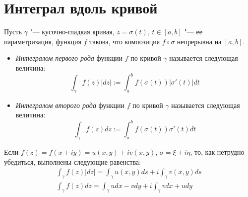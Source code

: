 \section{Интеграл вдоль кривой}

\begin{definition}
	Пусть $\gamma$ "--- кусочно-гладкая кривая, $z = \sigma(t)$, $t \in [a, b]$ "--- ее параметризация, функция $f$ такова, что композиция $f\circ\sigma$ непрерывна на $[a, b]$.
	\begin{itemize}
		\item \textit{Интегралом первого рода} функции $f$ по кривой $\gamma$ называется следующая величина:
		\[\int_{\gamma}f(z)|dz| := \int_a^bf(\sigma(t))|\sigma'(t)|dt\]
		\item \textit{Интегралом второго рода} функции $f$ по кривой $\gamma$ называется следующая величина:
		\[\int_{\gamma}f(z)dz := \int_a^bf(\sigma(t))\sigma'(t)dt\]
	\end{itemize}
\end{definition}

\begin{note}
	Если $f(z) = f(x + iy) = u(x, y) + iv(x, y)$, $\sigma = \xi + i\eta$, то, как нетрудно убедиться, выполнены следующие равенства:
	\begin{gather*}
		\int_{\gamma}f(z)|dz| = \int_\gamma u(x, y)ds + i\int_\gamma v(x, y)ds
		\\
		\int_{\gamma}f(z)dz = \int_\gamma udx - vdy + i\int_\gamma vdx + udy
	\end{gather*}
\end{note}

